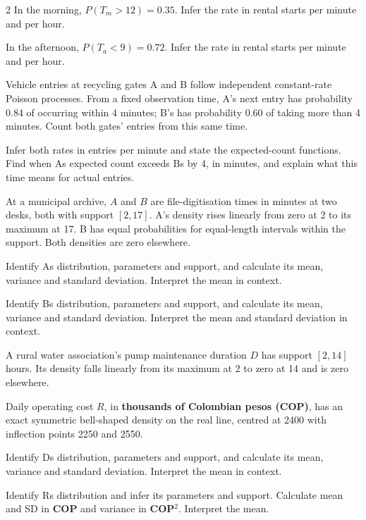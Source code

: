 \begin{multicols}{2}
In the morning, $P(T_m>12)=0.35$. Infer the rate in rental starts per minute and per hour. 

In the afternoon, $P(T_a<9)=0.72$. Infer the rate in rental starts per minute and per hour. 


Vehicle entries at recycling gates A and B follow independent constant-rate Poisson processes. From a fixed observation time, A's next entry has probability 0.84 of occurring within 4 minutes; B's has probability 0.60 of taking more than 4 minutes. Count both gates' entries from this same time.

Infer both rates in entries per minute and state the expected-count functions. Find when A\textquotesingle s expected count exceeds B\textquotesingle s by 4, in minutes, and explain what this time means for actual entries. 




At a municipal archive, $A$ and $B$ are file-digitisation times in minutes at two desks, both with support $[2,17]$. A's density rises linearly from zero at 2 to its maximum at 17. B has equal probabilities for equal-length intervals within the support. Both densities are zero elsewhere.

Identify A\textquotesingle s distribution, parameters and support, and calculate its mean, variance and standard deviation. Interpret the mean in context. 

Identify B\textquotesingle s distribution, parameters and support, and calculate its mean, variance and standard deviation. Interpret the mean and standard deviation in context. 


A rural water association's pump maintenance duration $D$ has support $[2,14]$ hours. Its density falls linearly from its maximum at 2 to zero at 14 and is zero elsewhere.

Daily operating cost $R$, in \textbf{thousands of Colombian pesos (COP)}, has an exact symmetric bell-shaped density on the real line, centred at 2400 with inflection points 2250 and 2550.

Identify D\textquotesingle s distribution, parameters and support, and calculate its mean, variance and standard deviation. Interpret the mean in context. 

Identify R\textquotesingle s distribution and infer its parameters and support. Calculate mean and SD in \textbf{COP} and variance in \textbf{COP$^2$}. Interpret the mean. 




\end{multicols}

